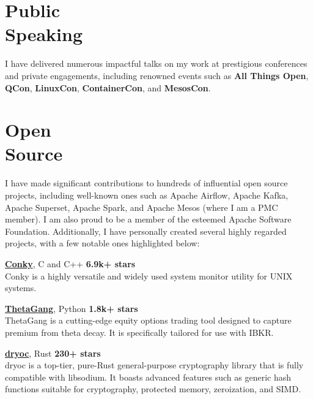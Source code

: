 \documentclass[margin,line]{resume}
\begin{document}
\begin{resume}
\vspace{3mm}

\section{\mysidestyle Public\\Speaking}

I have delivered numerous impactful talks on my work at prestigious conferences and private engagements, including renowned events such as \textbf{All Things Open}, \textbf{QCon}, \textbf{LinuxCon}, \textbf{ContainerCon}, and \textbf{MesosCon}.

\vspace{3mm}

\section{\mysidestyle Open\\Source}

I have made significant contributions to hundreds of influential open source projects, including well-known ones such as Apache Airflow, Apache Kafka, Apache Superset, Apache Spark, and Apache Mesos (where I am a PMC member). I am also proud to be a member of the esteemed Apache Software Foundation. Additionally, I have personally created several highly regarded projects, with a few notable ones highlighted below:

\href{https://github.com/brndnmtthws/conky}{\textbf{Conky}}, C and C++ \hfill \textbf{6.9k+ stars}\\
Conky is a highly versatile and widely used system monitor utility for UNIX systems.

\href{https://github.com/brndnmtthws/thetagang}{\textbf{ThetaGang}}, Python \hfill \textbf{1.8k+ stars}\\
ThetaGang is a cutting-edge equity options trading tool designed to capture premium from theta decay. It is specifically tailored for use with IBKR.

\href{https://github.com/brndnmtthws/dryoc}{\textbf{dryoc}}, Rust \hfill \textbf{230+ stars}\\
dryoc is a top-tier, pure-Rust general-purpose cryptography library that is fully compatible with libsodium. It boasts advanced features such as generic hash functions suitable for cryptography, protected memory, zeroization, and SIMD.

\vspace{3mm}


\end{resume}
\end{document}
